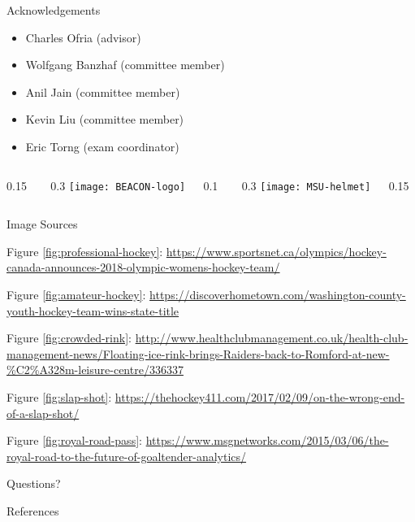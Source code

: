 \appendix

\begin{frame}{Acknowledgements}
\begin{itemize}
\item Charles Ofria (advisor)
\item Wolfgang Banzhaf (committee member)
\item Anil Jain (committee member)
\item Kevin Liu (committee member)
\item Eric Torng (exam coordinator)
\end{itemize}
\vspace{-1ex}

\newcommand{\innerspacer}{0.1\textwidth}
\newcommand{\content}{0.3\textwidth}
\newcommand{\outerspacer}{0.15\textwidth}


\begin{center}
 \begin{columns}
	\begin{column}{\outerspacer}~\end{column}
	 \begin{column}{\content}
		\texttt{[image: BEACON-logo]}
 	\end{column}
  \begin{column}{\innerspacer}~\end{column}
 	\begin{column}{\content}
   \texttt{[image: MSU-helmet]}
 	\end{column}
 	\begin{column}{\outerspacer}~\end{column}
 \end{columns}
\end{center}

\end{frame}

\begin{frame}[allowframebreaks]{Image Sources}

\footnotesize

Figure
\ref{fig:professional-hockey}:
\url{
https://www.sportsnet.ca/olympics/hockey-canada-announces-2018-olympic-womens-hockey-team/
}

Figure
\ref{fig:amateur-hockey}:
\url{
https://discoverhometown.com/washington-county-youth-hockey-team-wins-state-title
}

Figure
\ref{fig:crowded-rink}:
\url{
http://www.healthclubmanagement.co.uk/health-club-management-news/Floating-ice-rink-brings-Raiders-back-to-Romford-at-new-%
}

Figure
\ref{fig:slap-shot}:
\url{
https://thehockey411.com/2017/02/09/on-the-wrong-end-of-a-slap-shot/
}

Figure
\ref{fig:royal-road-pass}:
\url{
https://www.msgnetworks.com/2015/03/06/the-royal-road-to-the-future-of-goaltender-analytics/
}

\end{frame}

\begin{frame}[standout]
  Questions?
\end{frame}

\begin{frame}[allowframebreaks]{References}

  
  
\end{frame}
